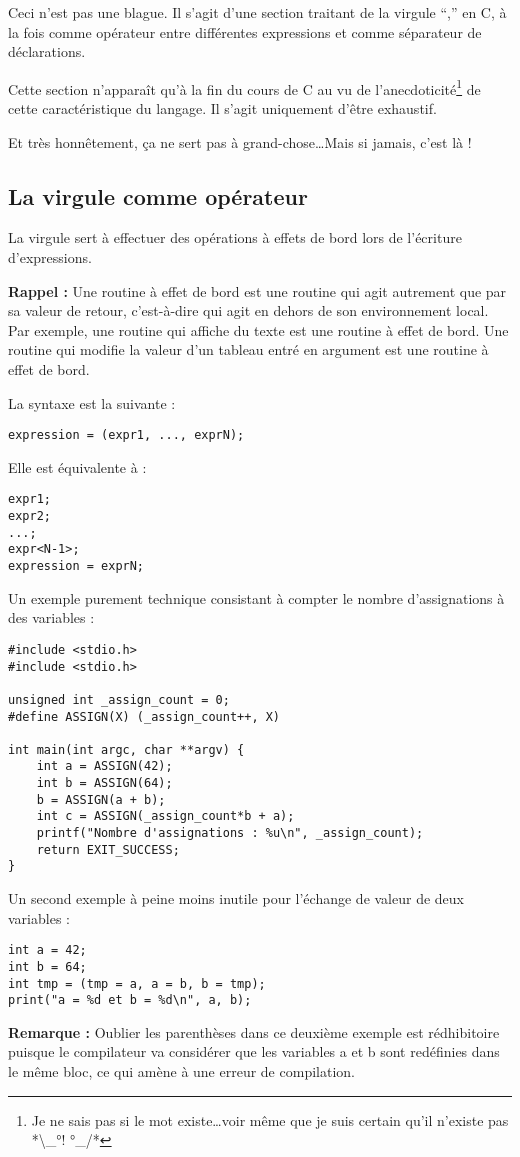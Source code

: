 \documentclass[../../../main.tex]{subfiles}
\begin{document}
Ceci n’est pas une blague. Il s’agit d’une section traitant de la virgule ``,'' en C, à la fois comme
opérateur entre différentes expressions et comme séparateur de déclarations.

Cette section n’apparaît qu’à la fin du cours de C au vu de l’anecdoticité\footnote{Je ne sais pas si le mot existe\dots voir même que je suis certain qu'il n'existe pas *\textbackslash{}\_°! °\_/*} de cette caractéristique du
langage. Il s’agit uniquement d’être exhaustif.

Et très honnêtement, ça ne sert pas à grand-chose\dots Mais si jamais, c’est là !
\subsection{La virgule comme opérateur}
\label{sub:la_virgule_comme_op_rateur}
La virgule sert à effectuer des opérations à effets de bord lors de l’écriture d’expressions.

\textbf{Rappel :} Une routine à effet de bord est une routine qui agit autrement que par sa valeur de retour,
c’est-à-dire qui agit en dehors de son environnement local. Par exemple, une routine qui affiche du
texte est une routine à effet de bord. Une routine qui modifie la valeur d’un tableau entré en argument
est une routine à effet de bord.

La syntaxe est la suivante :
\begin{verbatim}
expression = (expr1, ..., exprN);
\end{verbatim}
Elle est équivalente à :
\begin{verbatim}
expr1;
expr2;
...;
expr<N-1>;
expression = exprN;
\end{verbatim}
Un exemple purement technique consistant à compter le nombre d’assignations à des variables :
\begin{verbatim}
#include <stdio.h>
#include <stdio.h>

unsigned int _assign_count = 0;
#define ASSIGN(X) (_assign_count++, X)

int main(int argc, char **argv) {
	int a = ASSIGN(42);
	int b = ASSIGN(64);
	b = ASSIGN(a + b);
	int c = ASSIGN(_assign_count*b + a);
	printf("Nombre d'assignations : %u\n", _assign_count);
	return EXIT_SUCCESS;
}
\end{verbatim}
Un second exemple à peine moins inutile pour l’échange de valeur de deux variables :
\begin{verbatim}
int a = 42;
int b = 64;
int tmp = (tmp = a, a = b, b = tmp);
print("a = %d et b = %d\n", a, b);
\end{verbatim}
\textbf{Remarque :} Oublier les parenthèses dans ce deuxième exemple est rédhibitoire puisque le compilateur
va considérer que les variables a et b sont redéfinies dans le même bloc, ce qui amène à une erreur de
compilation.
\end{document}
